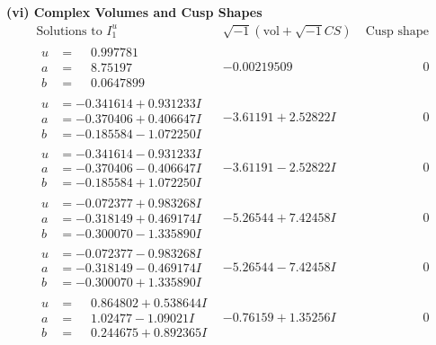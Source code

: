 \documentclass[1p]{elsarticle_modified}
\theoremstyle{definition}
\newcommand{\I}{\sqrt{-1}}
\begin{document}
\newpage\flushleft \textbf{(vi) Complex Volumes and Cusp Shapes}
$$\begin{array}{c|c|c}  
\text{Solutions to }I^u_{1}& \I (\text{vol} + \sqrt{-1}CS) & \text{Cusp shape}\\
 \hline 
\begin{aligned}
u &= \phantom{-}0.997781\phantom{ +0.000000I} \\
a &= \phantom{-}8.75197\phantom{ +0.000000I} \\
b &= \phantom{-}0.0647899\phantom{ +0.000000I}\end{aligned}
 & -0.00219509\phantom{ +0.000000I} & \phantom{-0.000000 } 0 \\ \hline\begin{aligned}
u &= -0.341614 + 0.931233 I \\
a &= -0.370406 + 0.406647 I \\
b &= -0.185584 - 1.072250 I\end{aligned}
 & -3.61191 + 2.52822 I & \phantom{-0.000000 } 0 \\ \hline\begin{aligned}
u &= -0.341614 - 0.931233 I \\
a &= -0.370406 - 0.406647 I \\
b &= -0.185584 + 1.072250 I\end{aligned}
 & -3.61191 - 2.52822 I & \phantom{-0.000000 } 0 \\ \hline\begin{aligned}
u &= -0.072377 + 0.983268 I \\
a &= -0.318149 + 0.469174 I \\
b &= -0.300070 - 1.335890 I\end{aligned}
 & -5.26544 + 7.42458 I & \phantom{-0.000000 } 0 \\ \hline\begin{aligned}
u &= -0.072377 - 0.983268 I \\
a &= -0.318149 - 0.469174 I \\
b &= -0.300070 + 1.335890 I\end{aligned}
 & -5.26544 - 7.42458 I & \phantom{-0.000000 } 0 \\ \hline\begin{aligned}
u &= \phantom{-}0.864802 + 0.538644 I \\
a &= \phantom{-}1.02477 - 1.09021 I \\
b &= \phantom{-}0.244675 + 0.892365 I\end{aligned}
 & -0.76159 + 1.35256 I & \phantom{-0.000000 } 0 \\ \hline\begin{aligned}

\end{aligned}
\end{array}$$
\end{document}
